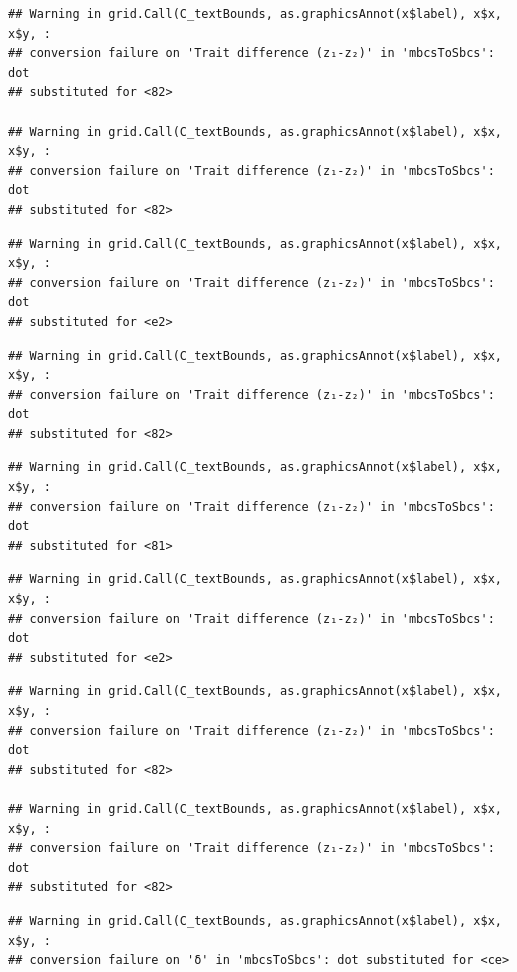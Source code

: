 \documentclass[]{article}
\begin{document}
\begin{verbatim}
## Warning in grid.Call(C_textBounds, as.graphicsAnnot(x$label), x$x, x$y, :
## conversion failure on 'Trait difference (z₁-z₂)' in 'mbcsToSbcs': dot
## substituted for <82>

## Warning in grid.Call(C_textBounds, as.graphicsAnnot(x$label), x$x, x$y, :
## conversion failure on 'Trait difference (z₁-z₂)' in 'mbcsToSbcs': dot
## substituted for <82>
\end{verbatim}

\begin{verbatim}
## Warning in grid.Call(C_textBounds, as.graphicsAnnot(x$label), x$x, x$y, :
## conversion failure on 'Trait difference (z₁-z₂)' in 'mbcsToSbcs': dot
## substituted for <e2>
\end{verbatim}

\begin{verbatim}
## Warning in grid.Call(C_textBounds, as.graphicsAnnot(x$label), x$x, x$y, :
## conversion failure on 'Trait difference (z₁-z₂)' in 'mbcsToSbcs': dot
## substituted for <82>
\end{verbatim}

\begin{verbatim}
## Warning in grid.Call(C_textBounds, as.graphicsAnnot(x$label), x$x, x$y, :
## conversion failure on 'Trait difference (z₁-z₂)' in 'mbcsToSbcs': dot
## substituted for <81>
\end{verbatim}

\begin{verbatim}
## Warning in grid.Call(C_textBounds, as.graphicsAnnot(x$label), x$x, x$y, :
## conversion failure on 'Trait difference (z₁-z₂)' in 'mbcsToSbcs': dot
## substituted for <e2>
\end{verbatim}

\begin{verbatim}
## Warning in grid.Call(C_textBounds, as.graphicsAnnot(x$label), x$x, x$y, :
## conversion failure on 'Trait difference (z₁-z₂)' in 'mbcsToSbcs': dot
## substituted for <82>

## Warning in grid.Call(C_textBounds, as.graphicsAnnot(x$label), x$x, x$y, :
## conversion failure on 'Trait difference (z₁-z₂)' in 'mbcsToSbcs': dot
## substituted for <82>
\end{verbatim}

\begin{verbatim}
## Warning in grid.Call(C_textBounds, as.graphicsAnnot(x$label), x$x, x$y, :
## conversion failure on 'δ' in 'mbcsToSbcs': dot substituted for <ce>
\end{verbatim}
\end{document}
